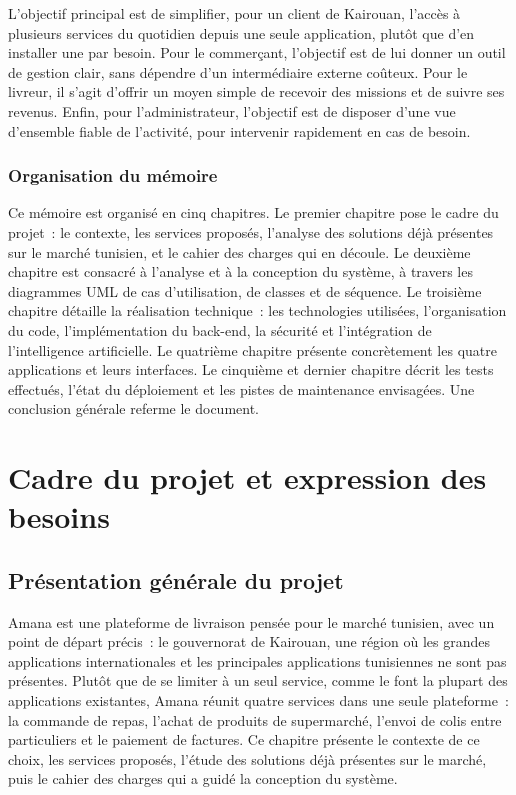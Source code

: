 \documentclass[12pt,fleqn,a4paper]{report}
\begin{document}
\begin{justify}
L'objectif principal est de simplifier, pour un client de Kairouan, l'accès à plusieurs services du quotidien depuis une seule application, plutôt que d'en installer une par besoin. Pour le commerçant, l'objectif est de lui donner un outil de gestion clair, sans dépendre d'un intermédiaire externe coûteux. Pour le livreur, il s'agit d'offrir un moyen simple de recevoir des missions et de suivre ses revenus. Enfin, pour l'administrateur, l'objectif est de disposer d'une vue d'ensemble fiable de l'activité, pour intervenir rapidement en cas de besoin.

\subsection*{Organisation du mémoire}

Ce mémoire est organisé en cinq chapitres. Le premier chapitre pose le cadre du projet~: le contexte, les services proposés, l'analyse des solutions déjà présentes sur le marché tunisien, et le cahier des charges qui en découle. Le deuxième chapitre est consacré à l'analyse et à la conception du système, à travers les diagrammes UML de cas d'utilisation, de classes et de séquence. Le troisième chapitre détaille la réalisation technique~: les technologies utilisées, l'organisation du code, l'implémentation du back-end, la sécurité et l'intégration de l'intelligence artificielle. Le quatrième chapitre présente concrètement les quatre applications et leurs interfaces. Le cinquième et dernier chapitre décrit les tests effectués, l'état du déploiement et les pistes de maintenance envisagées. Une conclusion générale referme le document.

\chapter{Cadre du projet et expression des besoins}

\section{Présentation générale du projet}

Amana est une plateforme de livraison pensée pour le marché tunisien, avec un point de départ précis~: le gouvernorat de Kairouan, une région où les grandes applications internationales et les principales applications tunisiennes ne sont pas présentes. Plutôt que de se limiter à un seul service, comme le font la plupart des applications existantes, Amana réunit quatre services dans une seule plateforme~: la commande de repas, l'achat de produits de supermarché, l'envoi de colis entre particuliers et le paiement de factures. Ce chapitre présente le contexte de ce choix, les services proposés, l'étude des solutions déjà présentes sur le marché, puis le cahier des charges qui a guidé la conception du système.


\end{justify}
\end{document}
